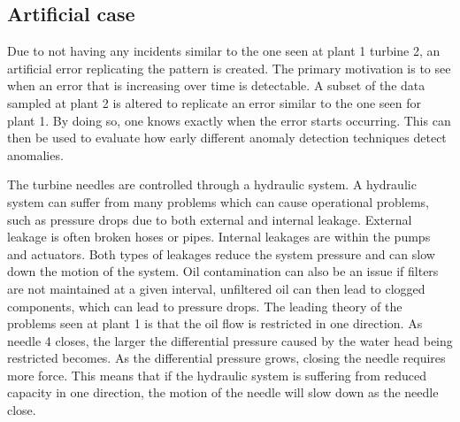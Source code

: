         
    
        
        
        
        
         
         
    \subsection{Artificial case}\label{subsec:arti}
        Due to not having any incidents similar to the one seen at plant 1 turbine 2, an artificial error replicating the pattern is created. The primary motivation is to see when an error that is increasing over time is detectable. A subset of the data sampled at plant 2 is altered to replicate an error similar to the one seen for plant 1. By doing so, one knows exactly when the error starts occurring. This can then be used to evaluate how early different anomaly detection techniques detect anomalies.
    
        The turbine needles are controlled through a hydraulic system. A hydraulic system can suffer from many problems which can cause operational problems, such as pressure drops due to both external and internal leakage. External leakage is often broken hoses or pipes. Internal leakages are within the pumps and actuators. Both types of leakages reduce the system pressure and can slow down the motion of the system. Oil contamination can also be an issue if filters are not maintained at a given interval, unfiltered oil can then lead to clogged components, which can lead to pressure drops. The leading theory of the problems seen at plant 1 is that the oil flow is restricted in one direction. As needle 4 closes, the larger the differential pressure caused by the water head being restricted becomes. As the differential pressure grows, closing the needle requires more force. This means that if the hydraulic system is suffering from reduced capacity in one direction, the motion of the needle will slow down as the needle close. 
        
